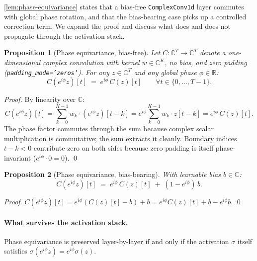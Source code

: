 \documentclass{article}
\providecommand{\Cref}[1]{\autoref{#1}}
\newtheorem{proposition}{Proposition}
\newcommand{\code}[1]{\texttt{#1}}
\begin{document}
\Cref{lem:phase-equivariance} states that a bias-free
\code{ComplexConv1d} layer commutes with global phase rotation, and
that the bias-bearing case picks up a controlled correction term. We
expand the proof and discuss what does and does not propagate through
the activation stack.

\begin{proposition}[Phase equivariance, bias-free]
\label{prop:phase-equivariance-biasfree}
Let $C : \mathbb{C}^{T} \to \mathbb{C}^{T}$ denote a one-dimensional
complex convolution with kernel $w \in \mathbb{C}^{K}$, no bias, and
zero padding (\code{padding\_mode='zeros'}). For any
$z \in \mathbb{C}^{T}$ and any global phase $\phi \in \mathbb{R}$:
\[
  C(e^{i\phi} z)[t] \;=\; e^{i\phi} \, C(z)[t]
  \qquad \forall t \in \{0, \ldots, T-1\}.
\]
\end{proposition}

\begin{proof}
By linearity over $\mathbb{C}$:
\[
  C(e^{i\phi} z)[t]
  = \sum_{k=0}^{K-1} w_k \cdot (e^{i\phi} z)[t-k]
  = e^{i\phi} \sum_{k=0}^{K-1} w_k \cdot z[t-k]
  = e^{i\phi} \, C(z)[t].
\]
The phase factor commutes through the sum because complex scalar
multiplication is commutative; the sum extracts it cleanly. Boundary
indices $t - k < 0$ contribute zero on both sides because zero padding
is itself phase-invariant ($e^{i\phi} \cdot 0 = 0$). \qed
\end{proof}

\begin{proposition}[Phase equivariance, bias-bearing]
\label{prop:phase-equivariance-bias}
With learnable bias $b \in \mathbb{C}$:
\[
  C(e^{i\phi} z)[t] \;=\; e^{i\phi} \, C(z)[t] \;+\; (1 - e^{i\phi}) \, b.
\]
\end{proposition}

\begin{proof}
$C(e^{i\phi} z)[t] = e^{i\phi} (C(z)[t] - b) + b = e^{i\phi} C(z)[t] +
b - e^{i\phi} b$. \qed
\end{proof}

\paragraph{What survives the activation stack.} Phase equivariance is
preserved layer-by-layer if and only if the activation $\sigma$ itself
satisfies $\sigma(e^{i\phi} z) = e^{i\phi} \sigma(z)$.
\end{document}
